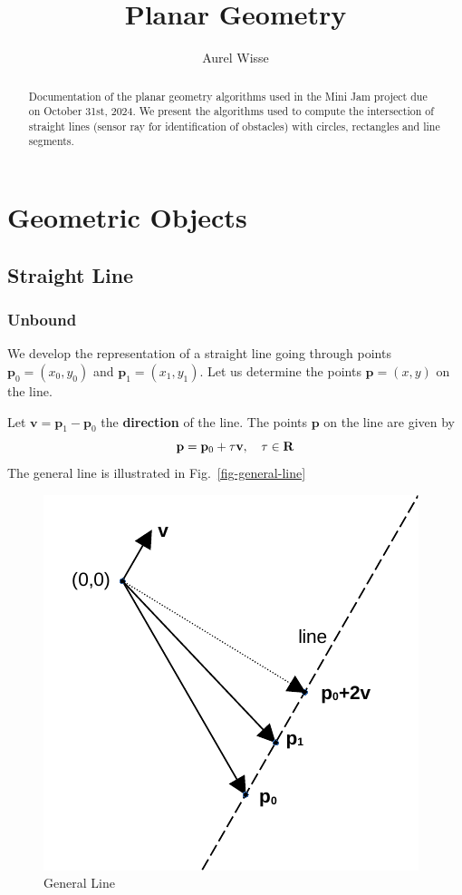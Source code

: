 \documentclass[11pt]{article}
\newcommand{\pb}{\mathbf{p}}
\newcommand{\Rb}{\mathbf{R}}
\newcommand{\vb}{\mathbf{v}}
\newcommand{\figref}[1]{Fig.~\eqref{#1}}
\begin{document}
%
%
\title{Planar Geometry}
\author{Aurel Wisse}
\maketitle
%
%
\begin{abstract}
Documentation of the planar geometry algorithms used in the
Mini Jam project due on October 31st, 2024. We present the algorithms used to
compute the intersection of straight lines (sensor ray for identification
of obstacles) with circles, rectangles and line segments.
\end{abstract}
%
\pagebreak
\tableofcontents
\listoftables
\listoffigures
\pagebreak
%
\section{Geometric Objects}
\label{sec-geometric-objects}
\subsection{Straight Line}
\label{sec-straight-line}

\subsubsection{Unbound}
\label{sec-line-unbound}
We develop the representation of a straight line going through
points $\pb_0=(x_0, y_0)$ and $\pb_1=(x_1, y_1)$. 
Let us determine the points $\pb=(x, y)$ on the line.

Let $\vb=\pb_1-\pb_0$ the {\bf direction} of the line. The points $\pb$ on the 
line are given by
\begin{equation}
    \pb=\pb_0 + \tau \vb,\quad \tau\in\Rb \label{eq-line-general} \\
\end{equation}
The general line is illustrated in \figref{fig-general-line}
\begin{figure}
    \centering
    \includegraphics{odg/general-line.pdf}
    \caption{General Line}\label{fig-general-line}
\end{figure}
\end{document}
